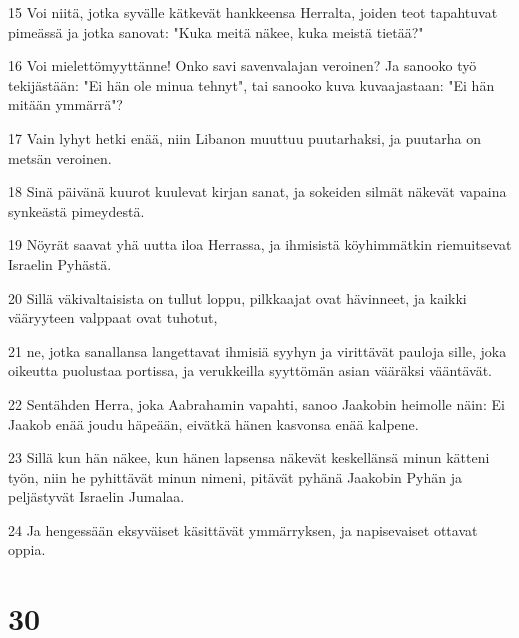 \par 15 Voi niitä, jotka syvälle kätkevät hankkeensa Herralta, joiden teot tapahtuvat pimeässä ja jotka sanovat: "Kuka meitä näkee, kuka meistä tietää?"
\par 16 Voi mielettömyyttänne! Onko savi savenvalajan veroinen? Ja sanooko työ tekijästään: "Ei hän ole minua tehnyt", tai sanooko kuva kuvaajastaan: "Ei hän mitään ymmärrä"?
\par 17 Vain lyhyt hetki enää, niin Libanon muuttuu puutarhaksi, ja puutarha on metsän veroinen.
\par 18 Sinä päivänä kuurot kuulevat kirjan sanat, ja sokeiden silmät näkevät vapaina synkeästä pimeydestä.
\par 19 Nöyrät saavat yhä uutta iloa Herrassa, ja ihmisistä köyhimmätkin riemuitsevat Israelin Pyhästä.
\par 20 Sillä väkivaltaisista on tullut loppu, pilkkaajat ovat hävinneet, ja kaikki vääryyteen valppaat ovat tuhotut,
\par 21 ne, jotka sanallansa langettavat ihmisiä syyhyn ja virittävät pauloja sille, joka oikeutta puolustaa portissa, ja verukkeilla syyttömän asian vääräksi vääntävät.
\par 22 Sentähden Herra, joka Aabrahamin vapahti, sanoo Jaakobin heimolle näin: Ei Jaakob enää joudu häpeään, eivätkä hänen kasvonsa enää kalpene.
\par 23 Sillä kun hän näkee, kun hänen lapsensa näkevät keskellänsä minun kätteni työn, niin he pyhittävät minun nimeni, pitävät pyhänä Jaakobin Pyhän ja peljästyvät Israelin Jumalaa.
\par 24 Ja hengessään eksyväiset käsittävät ymmärryksen, ja napisevaiset ottavat oppia.

\chapter{30}

